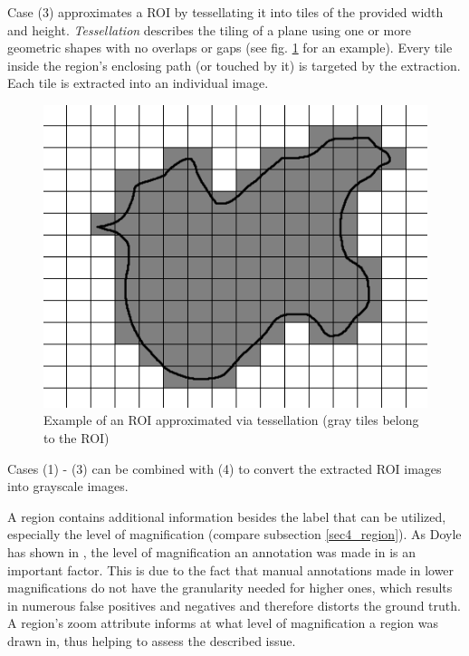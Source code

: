 Case (3) approximates a ROI by tessellating it into tiles of the provided width and height. \emph{Tessellation} describes the tiling of a plane using one or more geometric shapes with no overlaps or gaps (see fig. \ref{fig5_tesExample} for an example)\cite{Clifford09}. Every tile inside the region's enclosing path (or touched by it) is targeted by the extraction. Each tile is extracted into an individual image.

\begin{figure}[H]
	\begin{center}
		\includegraphics[scale=0.4]{img/tessellation.png}
		\caption{Example of an ROI approximated via tessellation (gray tiles belong to the ROI)}
		\label{fig5_tesExample}
	\end{center}
\end{figure}

Cases (1) - (3) can be combined with (4) to convert the extracted ROI images into grayscale images.

A region contains additional information besides the label that can be utilized, especially the level of magnification (compare subsection \ref{sec4_region}). As Doyle has shown in \cite{Doyle10}, the level of magnification an annotation was made in is an important factor. This is due to the fact that manual annotations made in lower magnifications do not have the granularity needed for higher ones, which results in numerous false positives and negatives and therefore distorts the ground truth\cite{Janowczyk16}. A region's zoom attribute informs at what level of magnification a region was drawn in, thus helping to assess the described issue.

